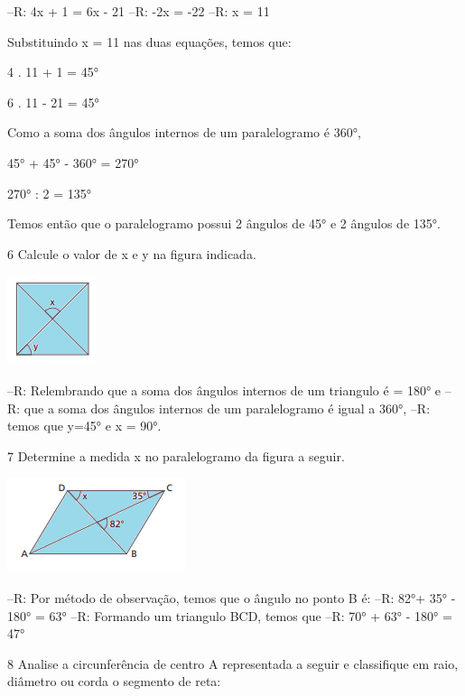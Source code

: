 {--R: 4x + 1 = 6x - 21
--R: -2x = -22
--R: x = 11

Substituindo x = 11 nas duas equações, temos que:

4 . 11 + 1 = 45°

6 . 11 - 21 = 45°

Como a soma dos ângulos internos de um paralelogramo é 360°,

45° + 45° - 360° = 270°

270° : 2 = 135°

Temos então que o paralelogramo possui 2 ângulos de 45° e 2 ângulos de
135°.

\num{6} Calcule o valor de x e y na figura indicada.

\includegraphics[width=1.03125in,height=1.03125in]{./imgSAEB_8_MAT/media/image10.png}

--R: Relembrando que a soma dos ângulos internos de um triangulo é = 180° e
--R: que a soma dos ângulos internos de um paralelogramo é igual a 360°,
--R: temos que y=45° e x = 90°.

\num{7} Determine a medida x no paralelogramo da figura a seguir.

\includegraphics[width=2.05208in,height=1.09375in]{./imgSAEB_8_MAT/media/image11.png}

--R: Por método de observação, temos que o ângulo no ponto B é:
--R: 82°+ 35° - 180° = 63°
--R: Formando um triangulo BCD, temos que
--R: 70° + 63° - 180° = 47°

\num{8} Analise a circunferência de centro A representada a seguir e
classifique em raio, diâmetro ou corda o segmento de reta:

}
